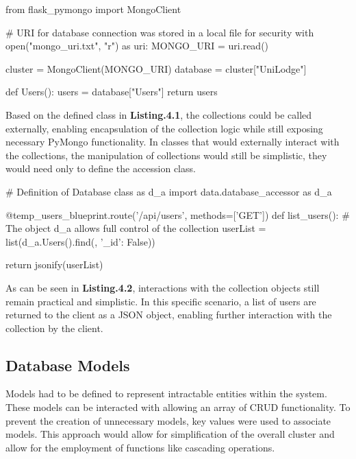 \begin{python}[caption=Database Accession Class]
from flask_pymongo import MongoClient

# URI for database connection was stored in a local file for security
with open("mongo_uri.txt", "r") as uri:
    MONGO_URI = uri.read()
    
cluster = MongoClient(MONGO_URI)
database = cluster["UniLodge"]

def Users():
    users = database["Users"]
    return users
\end{python}

Based on the defined class in \textbf{Listing.4.1}, the collections could be called externally, enabling encapsulation of the collection logic while still exposing necessary PyMongo functionality. In classes that would externally interact with the collections, the manipulation of collections would still be simplistic, they would need only to define the accession class. \newline

\begin{python}[caption=Interacting with Collections]
# Definition of Database class as d_a
import data.database_accessor as d_a

@temp_users_blueprint.route('/api/users', methods=['GET'])
def list_users():
    # The object d_a allows full control of the collection
    userList = list(d_a.Users().find({}, {'_id': False}))

    return jsonify(userList)
\end{python}

As can be seen in \textbf{Listing.4.2}, interactions with the collection objects still remain practical and simplistic. In this specific scenario, a list of users are returned to the client as a JSON object, enabling further interaction with the collection by the client.

\subsection{Database Models}
Models had to be defined to represent intractable entities within the system. These models can be interacted with allowing an array of CRUD functionality. To prevent the creation of unnecessary models, key values were used to associate models. This approach would allow for simplification of the overall cluster and allow for the employment of functions like cascading operations.

